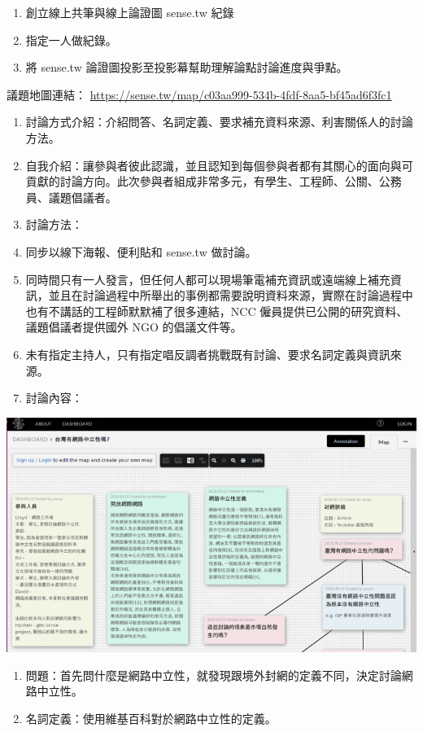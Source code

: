 \documentclass[12pt,a4paper]{article}
\begin{document}
\begin{enumerate}
\begin{enumerate}
\begin{enumerate}
\item 創立線上共筆與線上論證圖 sense.tw 紀錄
\item 指定一人做紀錄。
\item 將 sense.tw 論證圖投影至投影幕幫助理解論點討論進度與爭點。
\end{enumerate}
議題地圖連結： \url{https://sense.tw/map/c03aa999-534b-4fdf-8aa5-bf45ad6f3fc1}
\begin{enumerate}
\item 討論方式介紹：介紹問答、名詞定義、要求補充資料來源、利害關係人的討論方法。
\item 自我介紹：讓參與者彼此認識，並且認知到每個參與者都有其關心的面向與可貢獻的討論方向。此次參與者組成非常多元，有學生、工程師、公關、公務員、議題倡議者。
\item 討論方法：
\item 同步以線下海報、便利貼和 sense.tw 做討論。
\item 同時間只有一人發言，但任何人都可以現場筆電補充資訊或遠端線上補充資訊，並且在討論過程中所舉出的事例都需要說明資料來源，實際在討論過程中也有不講話的工程師默默補了很多連結，NCC 僱員提供已公開的研究資料、議題倡議者提供國外 NGO 的倡議文件等。
\item 未有指定主持人，只有指定唱反調者挑戰既有討論、要求名詞定義與資訊來源。
\item 討論內容：
\end{enumerate}

\begin{center}
\includegraphics[width=.9\linewidth]{./images/net-neutrality1.png}
\end{center}

\begin{enumerate}
\item 問題：首先問什麼是網路中立性，就發現跟境外封網的定義不同，決定討論網路中立性。
\item 名詞定義：使用維基百科對於網路中立性的定義。
\end{enumerate}


\end{enumerate}
\end{enumerate}
\end{document}
